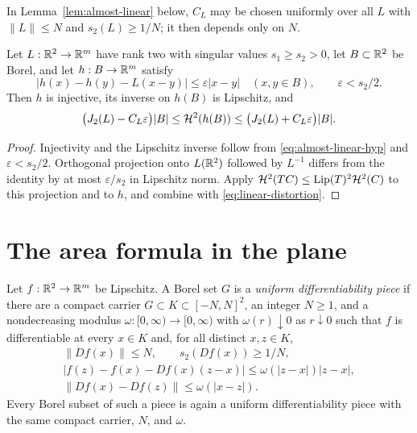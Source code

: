 \begin{constants}\label{const:almost-linear}
In Lemma~\ref{lem:almost-linear} below, $C_L$ may be chosen uniformly over all $L$ with $\|L\|\le N$ and
$s_2(L)\ge1/N$; it then depends only on $N$.
\end{constants}

\begin{lemma}\label{lem:almost-linear}
Let $L:\mathbb R^2\to\mathbb R^m$ have rank two with singular values
$s_1\ge s_2>0$, let $B\subset\mathbb R^2$ be Borel, and let $h:B\to\mathbb R^m$ satisfy
\begin{equation}\label{eq:almost-linear-hyp}
  |h(x)-h(y)-L(x-y)|\le\varepsilon|x-y|
  \quad(x,y\in B),\qquad\varepsilon<s_2/2 .
\end{equation}
Then $h$ is injective, its inverse on $h(B)$ is Lipschitz, and
\begin{equation}\label{eq:almost-linear}
  \bigl(J_2(L)-C_L\varepsilon\bigr)|B|
  \le\mathcal H^2(h(B))
  \le\bigl(J_2(L)+C_L\varepsilon\bigr)|B| .
\end{equation}
\end{lemma}

\begin{proof}
Injectivity and the Lipschitz inverse follow from
\eqref{eq:almost-linear-hyp} and $\varepsilon<s_2/2$.  Orthogonal projection
onto $L(\mathbb R^2)$ followed by $L^{-1}$ differs from the identity by at most
$\varepsilon/s_2$ in Lipschitz norm.  Apply
$\mathcal H^2(TC)\le\operatorname{Lip}(T)^2\mathcal H^2(C)$ to this projection and to $h$, and combine
with \eqref{eq:linear-distortion}.
\end{proof}

\section{The area formula in the plane}\label{sec:area-formula}

\begin{definition}\label{def:good-pieces}
Let $f:\mathbb R^2\to\mathbb R^m$ be Lipschitz.  A Borel set $G$ is a \emph{uniform
differentiability piece} if there are a compact carrier
$G\subset K\subset[-N,N]^2$, an integer $N\ge1$, and a nondecreasing modulus
$\omega:[0,\infty)\to[0,\infty)$ with $\omega(r)\downarrow0$ as
$r\downarrow0$ such that $f$ is differentiable at every $x\in K$ and, for
all distinct $x,z\in K$,
\begin{equation}\label{eq:good-pieces}
\begin{gathered}
  \|Df(x)\|\le N,\qquad s_2(Df(x))\ge1/N,\\
  |f(z)-f(x)-Df(x)(z-x)|\le\omega(|z-x|)|z-x|,\\
  \|Df(x)-Df(z)\|\le\omega(|x-z|).
\end{gathered}
\end{equation}
Every Borel subset of such a piece is again a uniform differentiability
piece with the same compact carrier, $N$, and $\omega$.
\end{definition}

